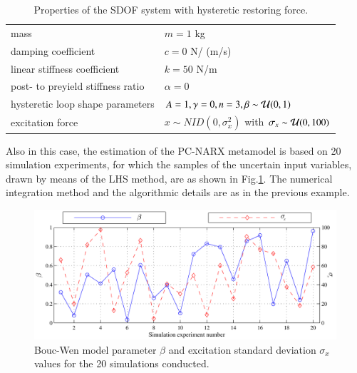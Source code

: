 \documentclass[preprint,3p,review,times,11pt]{elsarticle}
\begin{document}
\begin{table} 
\centering
\caption{Properties of the SDOF system with hysteretic restoring force.}\label{tab:boucwen_prop}
\begin{tabular}{ll}\hline
mass & $m = 1$ kg \\
damping coefficient & $c = 0 $ N/ (m/s) \\
linear stiffness coefficient & $k = 50 $ N/m\\
post- to preyield stiffness ratio & $\alpha = 0 $ \\
hysteretic loop shape parameters & $ A = 1, \gamma = 0, n = 3, \beta \sim {\cal U}(0,1) $ \\
excitation force & $x \sim NID(0,\sigma_x^2)$ with $\sigma_x \sim {\cal U}(0,100) $ \\ \hline
\end{tabular}
\end{table}



Also in this case, the estimation of the PC-NARX metamodel is based on 20 simulation experiments, for which the samples of the uncertain input variables, drawn by means of the LHS method, are as shown in Fig.\ref{fig:boucwen_uncprops}. The numerical integration method and the algorithmic details are as in the previous example.

\begin{figure}[t!]
\begin{center}
\includegraphics[width = 1\textwidth]{figs/boucwen_uncprops.pdf}
\caption{Bouc-Wen model parameter $\beta$ and excitation standard deviation $\sigma_x$ values for the 20 simulations conducted. \label{fig:boucwen_uncprops}}
\end{center}
\end{figure}
\end{document}

